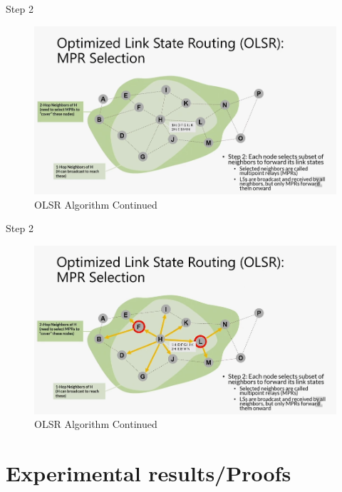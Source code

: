 \documentclass[11pt]{beamer}              %
\begin{document}
\begin{frame}{Step 2}

    \begin{figure}
        \centering
        \includegraphics[width=\textwidth]{figures/olsr9.png}
        \caption{OLSR Algorithm Continued \cite{coursera}}
    \end{figure}    
    
\end{frame}

\begin{frame}{Step 2}

    \begin{figure}
        \centering
        \includegraphics[width=\textwidth]{figures/olsr10.png}
        \caption{OLSR Algorithm Continued \cite{coursera}}
    \end{figure}    
    
\end{frame}

\section{Experimental results/Proofs}
\end{document}
